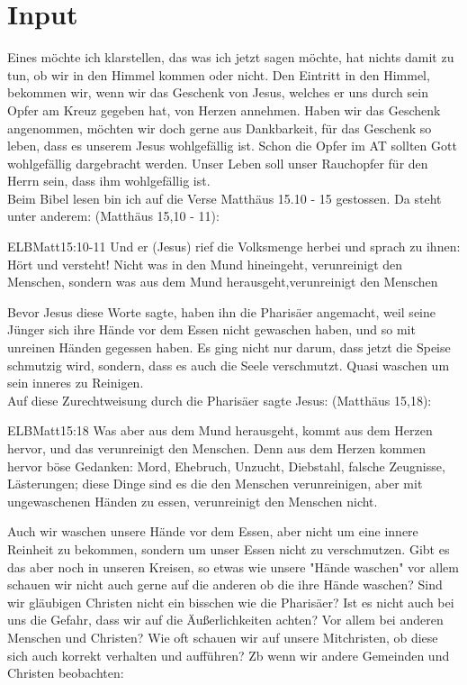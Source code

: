 \documentclass{../inc/mybib}
\begin{document}
\section{ Input }
Eines möchte ich klarstellen, das was ich jetzt sagen möchte, hat nichts damit zu tun, ob wir in den Himmel kommen oder nicht. Den Eintritt in den Himmel, bekommen wir, wenn wir das Geschenk von Jesus, welches er uns durch sein Opfer am Kreuz gegeben hat, von Herzen annehmen. Haben wir das Geschenk angenommen, möchten wir doch gerne aus Dankbarkeit, für das Geschenk so leben, dass es unserem Jesus wohlgefällig ist. Schon die Opfer im AT sollten Gott wohlgefällig dargebracht werden. Unser Leben soll unser Rauchopfer für den Herrn sein, dass ihm wohlgefällig ist.\\
Beim Bibel lesen bin ich auf die Verse Matthäus 15.10 - 15 gestossen. Da steht unter anderem:
(Matthäus 15,10 - 11):
\begin{bibelbox}{ELB}{Matt}{15:10-11}
Und er (Jesus) rief die Volksmenge herbei und sprach zu ihnen: \glqq{}Hört und versteht! Nicht was in den Mund hineingeht, verunreinigt den Menschen, sondern was aus dem Mund herausgeht,verunreinigt den Menschen\grqq
\end{bibelbox}
Bevor Jesus diese Worte sagte, haben ihn die Pharisäer angemacht, weil seine Jünger sich ihre Hände vor dem Essen nicht gewaschen haben, und so mit unreinen Händen gegessen haben. Es ging nicht nur darum, dass jetzt die Speise schmutzig wird, sondern, dass es auch die Seele verschmutzt. Quasi waschen um sein inneres zu Reinigen.\\
Auf diese Zurechtweisung durch die Pharisäer sagte Jesus:
(Matthäus 15,18):
\begin{bibelbox}{ELB}{Matt}{15:18}
\glqq{}Was aber aus dem Mund herausgeht, kommt aus dem Herzen hervor, und das verunreinigt den Menschen. Denn aus dem Herzen kommen hervor böse Gedanken: Mord, Ehebruch, Unzucht, Diebstahl, falsche Zeugnisse, Lästerungen; diese Dinge sind es die den Menschen verunreinigen, aber mit ungewaschenen Händen zu essen, verunreinigt den Menschen nicht.\grqq
\end{bibelbox}
Auch wir waschen unsere Hände vor dem Essen, aber nicht um eine innere Reinheit zu bekommen, sondern um unser Essen nicht zu verschmutzen. Gibt es das aber noch in unseren Kreisen, so etwas wie unsere "Hände waschen" vor allem schauen wir nicht auch gerne auf die anderen ob die ihre Hände waschen? Sind wir gläubigen Christen nicht ein bisschen wie die Pharisäer? Ist es nicht auch bei uns die Gefahr, dass wir auf die Äußerlichkeiten achten? Vor allem bei anderen Menschen und Christen? Wie oft schauen wir auf unsere Mitchristen, ob diese sich auch korrekt verhalten und aufführen? Zb wenn wir andere Gemeinden und Christen beobachten: 
\end{document}

